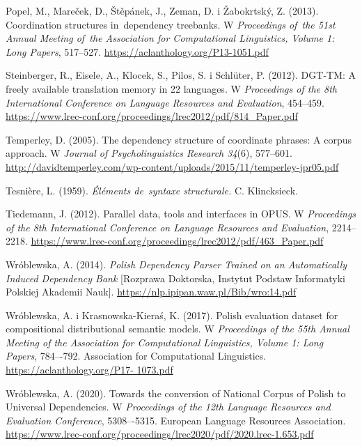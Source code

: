 \documentclass[licencjacka]{pracamgr_Kogni}
\begin{document}
\begin{thebibliography}{99}
        Popel, M., Mareček, D., Štěpánek, J., Zeman, D. i Žabokrtský, Z. (2013).
        Coordination structures in~dependency treebanks.
        W \textit{Proceedings of~the 51st Annual Meeting of~the Association for Computational Linguistics, Volume 1: Long Papers}, 517–527. \url{https://aclanthology.org/P13-1051.pdf}

        Steinberger, R., Eisele, A., Klocek, S., Pilos, S. i Schlüter, P. (2012).
        DGT-TM: A freely available translation memory in 22 languages.
        W \textit{Proceedings of the 8th International Conference on Language Resources and Evaluation}, 454–459. \url{https://www.lrec-conf.org/proceedings/lrec2012/pdf/814_Paper.pdf}

        Temperley, D. (2005). The dependency structure of coordinate phrases: A corpus approach. W \textit{Journal of Psycholinguistics Research 34}(6), 577--601.
        \url{http://davidtemperley.com/wp-content/uploads/2015/11/temperley-jpr05.pdf}

        Tesnière, L. (1959). \textit{Éléments de~syntaxe structurale.} C. Klincksieck.

        Tiedemann, J. (2012).
        Parallel data, tools and interfaces in OPUS. W \textit{Proceedings of the 8th International Conference on Language Resources and Evaluation}, 2214--2218. \url{https://www.lrec-conf.org/proceedings/lrec2012/pdf/463_Paper.pdf}

        Wróblewska, A. (2014). \textit{Polish Dependency Parser Trained on an Automatically Induced Dependency Bank} [Rozprawa Doktorska, Instytut Podstaw Informatyki Polskiej Akademii Nauk]. \url{https://nlp.ipipan.waw.pl/Bib/wro:14.pdf}

        Wróblewska, A. i Krasnowska-Kieraś, K. (2017). Polish evaluation dataset for compositional distributional semantic models. W \textit{Proceedings of the 55th Annual Meeting of the Association for Computational Linguistics, Volume 1: Long Papers}, 784–-792. Association for Computational Linguistics. \url{https://aclanthology.org/P17- 1073.pdf}

        Wróblewska, A. (2020). Towards the conversion of National Corpus of Polish to Universal Dependencies. W \textit{Proceedings of the 12th Language Resources and Evaluation Conference}, 5308–-5315. European Language Resources Association. \url{https://www.lrec-conf.org/proceedings/lrec2020/pdf/2020.lrec-1.653.pdf}
    \end{thebibliography} 
\end{document}
